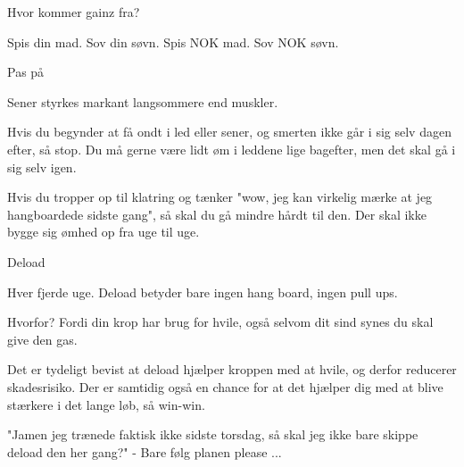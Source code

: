 \begin{multicols}{2}
  \begin{tList}{Hvor kommer gainz fra?}
  \item Spis din mad. Sov din søvn. Spis NOK mad. Sov NOK søvn.
  \end{tList}

  \begin{tList}{Pas på}
  \item Sener styrkes markant langsommere end muskler.

  \item Hvis du begynder at få ondt i led eller sener, og smerten
    ikke går i sig selv dagen efter, så stop. Du må gerne være lidt
    øm i leddene lige bagefter, men det skal gå i sig selv igen.

  \item Hvis du tropper op til klatring og tænker "wow, jeg kan
    virkelig mærke at jeg hangboardede sidste gang", så skal du gå
    mindre hårdt til den. Der skal ikke bygge sig ømhed op fra uge til uge.
  \end{tList}

  \begin{tList}{Deload}

  \item Hver fjerde uge. Deload betyder bare ingen hang board, ingen pull ups.

  \item Hvorfor?
    Fordi din krop har brug for hvile, også selvom dit sind synes
    du skal give den gas.

  \item Det er tydeligt bevist at deload hjælper kroppen med at
    hvile, og derfor reducerer skadesrisiko. Der er samtidig også en
    chance for at det hjælper dig med at blive stærkere i det lange
    løb, så win-win.

  \item "Jamen jeg trænede faktisk ikke sidste torsdag, så skal jeg
    ikke bare skippe deload den her gang?"
    - Bare følg planen please ...
  \end{tList}


\end{multicols}
